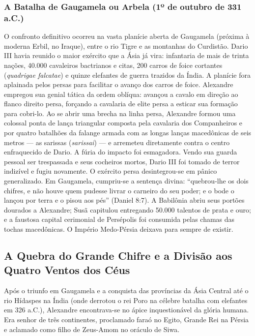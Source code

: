 \documentclass[11pt,a4paper,openany]{book}
\begin{document}
\subsubsection*{A Batalha de Gaugamela ou Arbela (1º de outubro de 331 a.C.)}
O confronto definitivo ocorreu na vasta planície aberta de Gaugamela (próxima à moderna Erbil, no Iraque), entre o rio Tigre e as montanhas do Curdistão. Dario III havia reunido o maior exército que a Ásia já vira: infantaria de mais de trinta nações, 40.000 cavaleiros bactrianos e citas, 200 carros de foice cortantes (\textit{quadrigae falcatae}) e quinze elefantes de guerra trazidos da Índia. A planície fora aplainada pelos persas para facilitar o avanço dos carros de foice.
Alexandre empregou sua genial tática da ordem oblíqua: avançou a cavalo em direção ao flanco direito persa, forçando a cavalaria de elite persa a esticar sua formação para cobri-lo. Ao se abrir uma brecha na linha persa, Alexandre formou uma colossal ponta de lança triangular composta pela cavalaria dos Companheiros e por quatro batalhões da falange armada com as longas lanças macedônicas de seis metros — as sarissas (\textit{sarissai}) — e arremeteu diretamente contra o centro enfraquecido de Dario. A fúria do impacto foi esmagadora. Vendo sua guarda pessoal ser trespassada e seus cocheiros mortos, Dario III foi tomado de terror indizível e fugiu novamente. O exército persa desintegrou-se em pânico generalizado. Em Gaugamela, cumpriu-se a sentença divina: ``quebrou-lhe os dois chifres, e não houve quem pudesse livrar o carneiro do seu poder; e o bode o lançou por terra e o pisou aos pés'' (Daniel 8:7). A Babilônia abriu seus portões dourados a Alexandre; Susã capitulou entregando 50.000 talentos de prata e ouro; e a faustosa capital cerimonial de Persépolis foi consumida pelas chamas das tochas macedônicas. O Império Medo-Pérsia deixava para sempre de existir.


\subsection{A Quebra do Grande Chifre e a Divisão aos Quatro Ventos dos Céus}


Após o triunfo em Gaugamela e a conquista das províncias da Ásia Central até o rio Hídaspes na Índia (onde derrotou o rei Poro na célebre batalha com elefantes em 326 a.C.), Alexandre encontrava-se no ápice inquestionável da glória humana. Era senhor de três continentes, proclamado faraó no Egito, Grande Rei na Pérsia e aclamado como filho de Zeus-Amom no oráculo de Siwa.
\end{document}
